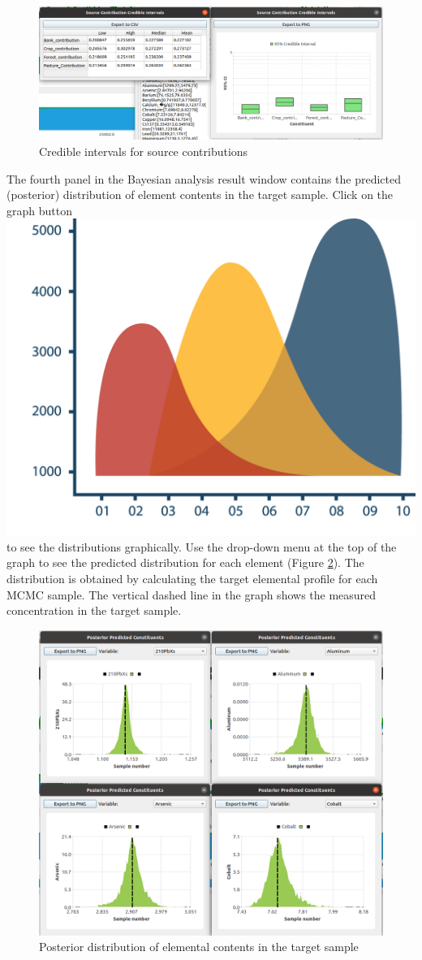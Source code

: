 \documentclass[12pt]{report}
\begin{document}
\begin{figure}[ht]
    \centering
    \includegraphics[width=14cm]{Figures/MCMC-credible-intervals.png} 
    \caption{Credible intervals for source contributions}
    \label{fig:MCMC-credible-interval}
\end{figure}
\FloatBarrier

The fourth panel in the Bayesian analysis result window contains the predicted (posterior) distribution of element contents in the target sample. Click on the graph button \includegraphics[width=0.5 cm]{Figures/Graph.png} to see the distributions graphically. Use the drop-down menu at the top of the graph to see the predicted distribution for each element (Figure \ref{fig:MCMC-posterior-elemental-content}). The distribution is obtained by calculating the target elemental profile for each MCMC sample. The vertical dashed line in the graph shows the measured concentration in the target sample. 

\begin{figure}[ht]
    \centering
    \includegraphics[width=14cm]{Figures/MCMC_Posterior_Elemental_Contents.png} 
    \caption{Posterior distribution of elemental contents in the target sample}
    \label{fig:MCMC-posterior-elemental-content}
\end{figure}
\FloatBarrier
\end{document}
